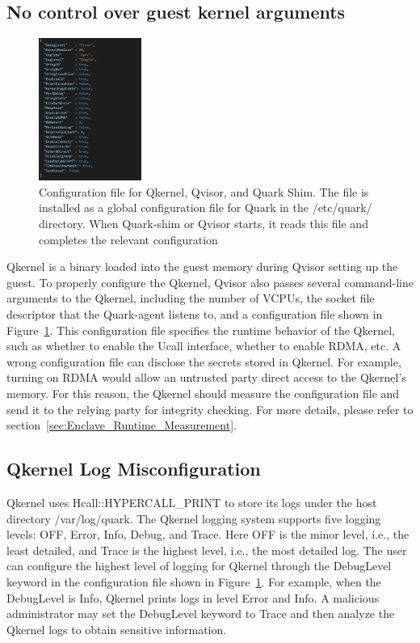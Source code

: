\subsection{No control over guest kernel arguments}
\begin{figure}[htp]
  \centering
  \includegraphics[width=0.3\textwidth]{images/quark_config.PNG}
  \caption[Configuration file for Qkernel, Qvisor, and Quark Shim]{Configuration file for Qkernel, Qvisor, and Quark Shim. The file is installed as a global configuration file for Quark in the /etc/quark/ directory. When Quark-shim or Qvisor starts, it reads this file and completes the relevant configuration}
  \label{fig:quark_config}
\end{figure}

Qkernel is a binary loaded into the guest memory during Qvisor setting up the guest. To properly configure the Qkernel, Qvisor also passes several command-line arguments to the Qkernel, including the number of VCPUs, the socket file descriptor that the Quark-agent listens to, and a configuration 
file shown in Figure~\ref{fig:quark_config}. This configuration file specifies the runtime behavior of the Qkernel, such as whether to enable the Ucall interface, whether to enable RDMA, etc. A wrong configuration file can disclose the secrets stored in Qkernel. For example, turning on RDMA would allow an untrusted 
party direct access to the Qkernel’s memory. For this reason, the Qkernel should measure the configuration file and send it to the relying party for integrity checking. For more details, please refer to section~\ref{sec:Enclave_Runtime_Measurement}.

\subsection{Qkernel Log Misconfiguration}
\label{sec:Qkernel_Log_Misconfiguration}
Qkernel uses Hcall::HYPERCALL\_PRINT to store its logs under the host directory /var/log/quark. The Qkernel logging system supports five logging levels: OFF, Error, Info, Debug, and Trace. Here OFF is the minor level, i.e., the least detailed, and Trace is the highest level, i.e., the most detailed log. The user can configure the highest level of logging for Qkernel through the DebugLevel keyword in the configuration file shown in Figure~\ref{fig:quark_config}. For example, when the DebugLevel is Info, Qkernel prints logs in level Error and Info. A malicious administrator may set the 
DebugLevel keyword to Trace and then analyze the Qkernel logs to obtain sensitive information.

